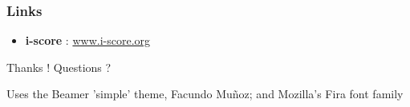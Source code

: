 \documentclass{beamer}
\begin{document}
\begin{frame}
    \frametitle{Links} 
    \Large
    \begin{itemize}
        \setlength\itemsep{1em}
        \item \textbf{i-score} : \url{www.i-score.org}
    \end{itemize}
        
    \centering
    \vspace{2em}
    \Large{Thanks ! Questions ?}
    \vspace{2em}
    
    \tiny{Uses the Beamer 'simple' theme, Facundo Muñoz; and Mozilla's Fira font family}
\end{frame}
\end{document}
